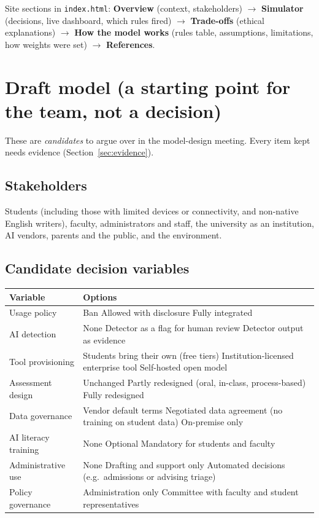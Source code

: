 \documentclass[11pt,a4paper]{article}
\newcommand{\code}[1]{\texttt{#1}}
\begin{document}
Site sections in \code{index.html}: \textbf{Overview} (context, stakeholders) $\rightarrow$
\textbf{Simulator} (decisions, live dashboard, which rules fired) $\rightarrow$ \textbf{Trade-offs}
(ethical explanations) $\rightarrow$ \textbf{How the model works} (rules table, assumptions,
limitations, how weights were set) $\rightarrow$ \textbf{References}.

\section{Draft model (a starting point for the team, not a decision)}

These are \emph{candidates} to argue over in the model-design meeting. Every item kept needs
evidence (Section~\ref{sec:evidence}).

\subsection{Stakeholders}
Students (including those with limited devices or connectivity, and non-native English writers),
faculty, administrators and staff, the university as an institution, AI vendors, parents and the
public, and the environment.

\subsection{Candidate decision variables}
\begin{tabularx}{\textwidth}{@{}p{3.6cm}L@{}}
\toprule
\textbf{Variable} & \textbf{Options} \\
\midrule
Usage policy & Ban \textperiodcentered{} Allowed with disclosure \textperiodcentered{} Fully integrated \\
AI detection & None \textperiodcentered{} Detector as a flag for human review \textperiodcentered{} Detector output as evidence \\
Tool provisioning & Students bring their own (free tiers) \textperiodcentered{} Institution-licensed enterprise tool \textperiodcentered{} Self-hosted open model \\
Assessment design & Unchanged \textperiodcentered{} Partly redesigned (oral, in-class, process-based) \textperiodcentered{} Fully redesigned \\
Data governance & Vendor default terms \textperiodcentered{} Negotiated data agreement (no training on student data) \textperiodcentered{} On-premise only \\
AI literacy training & None \textperiodcentered{} Optional \textperiodcentered{} Mandatory for students and faculty \\
Administrative use & None \textperiodcentered{} Drafting and support only \textperiodcentered{} Automated decisions (e.g.\ admissions or advising triage) \\
Policy governance & Administration only \textperiodcentered{} Committee with faculty and student representatives \\
\bottomrule
\end{tabularx}
\end{document}
